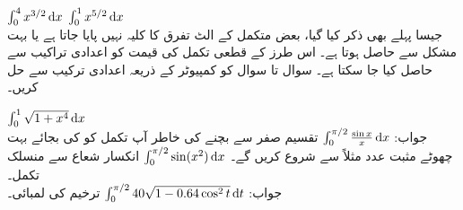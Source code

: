 $\int_0^4 x^{3/2}\dif x$
$\int_0^1 x^{5/2}\dif x$
\\
جیسا پہلے بھی ذکر کیا گیا، بعض متکمل کے الٹ تفرق کا کلیہ نہیں پایا جاتا ہے یا بہت مشکل سے حاصل ہوتا ہے۔ اس طرز کے قطعی تکمل کی قیمت کو اعدادی تراکیب سے حاصل کیا جا سکتا ہے۔ سوال  تا سوال  کو کمپیوٹر کے ذریعہ اعدادی ترکیب سے حل کریں۔

$\int_0^1\sqrt{1+x^4}\dif x$\\
جواب:\quad
{}
$\int_0^{\pi/2}\tfrac{\sin x}{x}\dif x$\quad
تقسیم صفر سے بچنے کی خاطر آپ تکمل کو  کی بجائے بہت چھوٹے مثبت عدد مثلاً  سے شروع کریں گے۔
$\int_0^{\pi/2}\sin(x^2)\dif x$\quad
انکسار شعاع سے منسلک تکمل۔\\
جواب:\quad
{}
$\int_0^{\pi/2}40\sqrt{1-0.64\cos^2t}\dif t$ \quad
ترخیم  کی لمبائی۔
